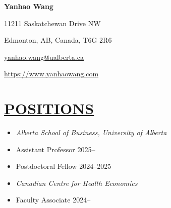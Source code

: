 \documentclass{res}
\begin{document}
\begin{resume}

\vspace{-50pt}

\begin{center}
  {\huge \textbf{Yanhao Wang}}
\end{center}

\setlength{\columnsep}{0.6cm}
\begin{multicols}{2}
{\small 11211 Saskatchewan Drive NW}

\vspace{-13pt}
{\small Edmonton, AB, Canada, T6G 2R6} 

\columnbreak
{\small \hfill \href{mailto:yanhao.wang@ualberta.ca}{yanhao.wang@ualberta.ca}}

\vspace{-13pt}
{\small \hfill \url{https://www.yanhaowang.com}}


\end{multicols}

\section{\large{\ul{POSITIONS}}}
\vspace{1.8em}
\begin{itemize}[leftmargin=15pt,labelindent=-15pt,itemindent=-15pt,itemsep=0.1em]
  \item[] \textit{Alberta School of Business, University of Alberta}
  \item[] \hspace{13pt} Assistant Professor \hfill    2025--
  \item[] \hspace{13pt} Postdoctoral Fellow \hfill    2024--2025
  \item[] \textit{Canadian Centre for Health Economics} 
  \item[] \hspace{13pt} Faculty Associate \hfill    2024--
\end{itemize}


\end{resume}
\end{document}
